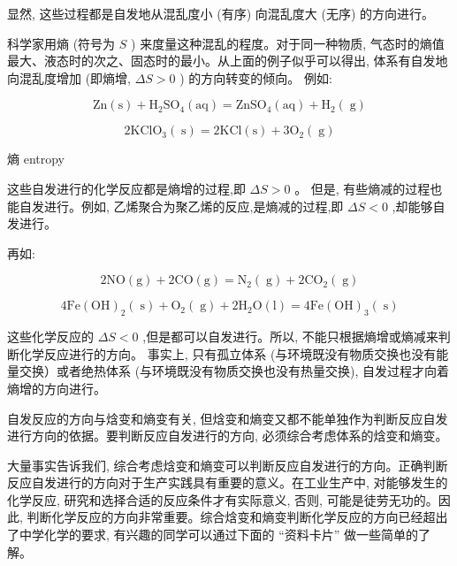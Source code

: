 \documentclass[10pt]{article}
\begin{document}
显然, 这些过程都是自发地从混乱度小 (有序) 向混乱度大 (无序) 的方向进行。

科学家用熵 (符号为 \(S\) ) 来度量这种混乱的程度。对于同一种物质, 气态时的熵值最大、液态时的次之、固态时的最小。从上面的例子似乎可以得出, 体系有自发地向混乱度增加 (即熵增, \({\Delta S} > 0\) ) 的方向转变的倾向。 例如:

\[
\mathrm{{Zn}}\left( \mathrm{s}\right) + {\mathrm{H}}_{2}{\mathrm{{SO}}}_{4}\left( \mathrm{{aq}}\right) = {\mathrm{{ZnSO}}}_{4}\left( \mathrm{{aq}}\right) + {\mathrm{H}}_{2}\left( \mathrm{\;g}\right)
\]

\[
2{\mathrm{{KClO}}}_{3}\left( \mathrm{\;s}\right) = 2\mathrm{{KCl}}\left( \mathrm{s}\right) + 3{\mathrm{O}}_{2}\left( \mathrm{\;g}\right)
\]

\begin{mdframed}

熵 entropy

\end{mdframed}

这些自发进行的化学反应都是熵增的过程,即 \({\Delta S} > 0\) 。 但是, 有些熵减的过程也能自发进行。例如, 乙烯聚合为聚乙烯的反应,是熵减的过程,即 \({\Delta S} < 0\) ,却能够自发进行。

再如:

\[
2\mathrm{{NO}}\left( \mathrm{g}\right) + 2\mathrm{{CO}}\left( \mathrm{g}\right) = {\mathrm{N}}_{2}\left( \mathrm{\;g}\right) + 2{\mathrm{{CO}}}_{2}\left( \mathrm{\;g}\right)
\]

\[
4\mathrm{{Fe}}{\left( \mathrm{{OH}}\right) }_{2}\left( \mathrm{\;s}\right) + {\mathrm{O}}_{2}\left( \mathrm{\;g}\right) + 2{\mathrm{H}}_{2}\mathrm{O}\left( \mathrm{l}\right) = 4\mathrm{{Fe}}{\left( \mathrm{{OH}}\right) }_{3}\left( \mathrm{\;s}\right)
\]

这些化学反应的 \({\Delta S} < 0\) ,但是都可以自发进行。所以, 不能只根据熵增或熵减来判断化学反应进行的方向。 事实上, 只有孤立体系 (与环境既没有物质交换也没有能量交换）或者绝热体系 (与环境既没有物质交换也没有热量交换), 自发过程才向着熵增的方向进行。

自发反应的方向与焓变和熵变有关, 但焓变和熵变又都不能单独作为判断反应自发进行方向的依据。要判断反应自发进行的方向, 必须综合考虑体系的焓变和熵变。

大量事实告诉我们, 综合考虑焓变和熵变可以判断反应自发进行的方向。正确判断反应自发进行的方向对于生产实践具有重要的意义。在工业生产中, 对能够发生的化学反应, 研究和选择合适的反应条件才有实际意义, 否则, 可能是徒劳无功的。因此, 判断化学反应的方向非常重要。综合焓变和熵变判断化学反应的方向已经超出了中学化学的要求, 有兴趣的同学可以通过下面的 “资料卡片” 做一些简单的了解。
\end{document}
